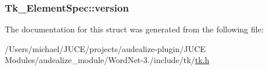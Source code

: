 \subsubsection[{\texorpdfstring{version}{version}}]{ Tk\+\_\+\+Element\+Spec\+::version}\hypertarget{struct_tk___element_spec_a0a91b405beabe4970b16248c3706c77b}{}\label{struct_tk___element_spec_a0a91b405beabe4970b16248c3706c77b}


The documentation for this struct was generated from the following file\+:\begin{DoxyCompactItemize}
\item 
/\+Users/michael/\+J\+U\+C\+E/projects/audealize-\/plugin/\+J\+U\+C\+E Modules/audealize\+\_\+module/\+Word\+Net-\/3./include/tk/\hyperlink{tk_8h}{tk.\+h}\end{DoxyCompactItemize}
